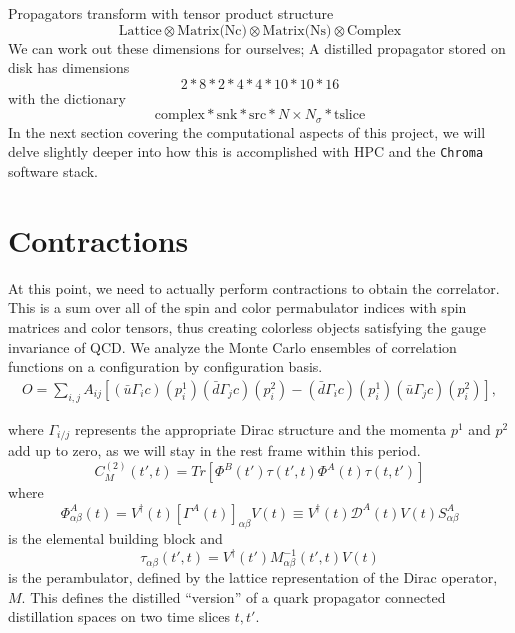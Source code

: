 Propagators transform with tensor product structure 
$$\text{Lattice} \otimes \text{Matrix(Nc)} \otimes \text{Matrix(Ns)} \otimes \text{Complex}$$
We can work out these dimensions for ourselves; A distilled propagator stored on disk has dimensions 
\begin{equation}
 2 * 8 * 2 * 4 * 4 * 10 * 10 * 16 
\end{equation}
with the dictionary 
\begin{equation}
 \text{} \text{complex} * \text{snk} * \text{src} * N \times N_{\sigma} * \text{tslice}
\end{equation}
In the next section covering the computational aspects of this project, we will delve slightly deeper into how this is accomplished with HPC and the \texttt{Chroma} software stack.

\section{Contractions}
At this point, we need to actually perform contractions to obtain the correlator. This is a sum over all of the spin and color permabulator indices with spin matrices and color tensors, thus creating colorless objects satisfying the gauge invariance of QCD. We analyze the Monte Carlo ensembles of correlation functions on a configuration by configuration basis. 
\begin{align}
    \label{ops_cc}
    O=\sum_{i,j} A_{ij}  [(\bar u\Gamma_i c)( p^1_{i})(\bar d\Gamma_{j} c)(p^2_{i}) -  (\bar d \Gamma_i c)({ p^1_{i}})(\bar u\Gamma_{j} c)({ p^2_{i}}) ]\nonumber,
    \end{align}

    where $\Gamma_{i/j}$ represents the appropriate Dirac structure and the momenta $p^1$ and $p^2$ add up to zero, as we will stay in the rest frame within this period. 
$$C_M^{(2)}(t',t) = Tr[\Phi^B(t')\tau(t',t)\Phi^A(t)\tau(t,t')]$$ 
where 
$$\Phi^A_{\alpha\beta}(t) = V^{\dagger}(t) [\Gamma^A(t)]_{\alpha\beta} V(t) \equiv V^{\dagger}(t)\mathcal{D}^A(t)V(t)S^A_{\alpha\beta}$$ is the elemental building block  
and 
$$\tau_{\alpha\beta}(t',t) = V^{\dagger}(t')M_{\alpha\beta}^{-1}(t',t)V(t)$$ 
is the perambulator, defined by the lattice representation of the Dirac operator, $M$. This defines the distilled ``version'' of a quark propagator connected distillation spaces on two time slices $t,t'$.  

